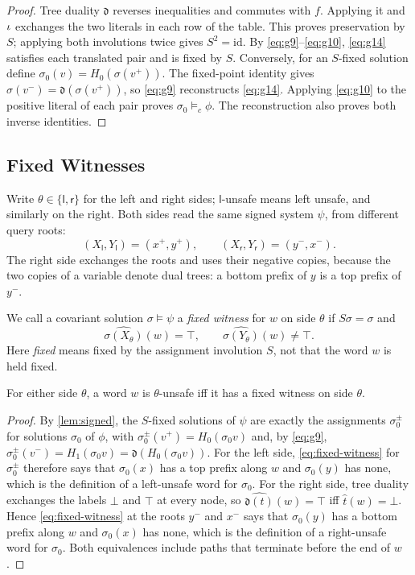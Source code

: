 \begin{proof} Tree duality $\mathfrak d$ reverses inequalities and commutes with
$f$. Applying it and $\iota$ exchanges the two literals in each row of
the table. This proves preservation by $S$; applying both involutions twice gives
$S^2=\mathrm{id}$. By \eqref{eq:g9}--\eqref{eq:g10},
\eqref{eq:g14} satisfies each translated pair and is fixed by $S$. Conversely, for
an $S$-fixed solution define $\sigma_0(v)=H_0(\sigma(v^+))$. The fixed-point
identity gives $\sigma(v^-)=\mathfrak d(\sigma(v^+))$, so \eqref{eq:g9} reconstructs \eqref{eq:g14}. Applying \eqref{eq:g10}
to the positive literal of each pair proves $\sigma_0\models_c\phi$.
The reconstruction also proves both inverse identities. \end{proof}


\subsection{Fixed Witnesses}\label{sec:fixed-witness}
Write $\theta\in\{\mathsf l,\mathsf r\}$ for the left and right sides;
$\mathsf l$-unsafe means left unsafe, and similarly on the right. Both sides
read the same signed system $\psi$, from different query roots:
\[
 (X_{\mathsf l},Y_{\mathsf l})=(x^+,y^+),\qquad
 (X_{\mathsf r},Y_{\mathsf r})=(y^-,x^-).
\]
The right side exchanges the roots and uses their negative copies, because
the two copies of a variable denote dual trees: a bottom prefix of $y$ is a
top prefix of $y^-$.

We call a covariant solution $\sigma\models\psi$ a \emph{fixed
witness} for $w$ on side $\theta$ if $S\sigma=\sigma$ and
\begin{equation}\label{eq:fixed-witness}
 \widehat{\sigma(X_\theta)}(w)=\top,\qquad
 \widehat{\sigma(Y_\theta)}(w)\ne\top.
\end{equation}
Here \emph{fixed} means fixed by the assignment involution $S$, not that
the word $w$ is held fixed.

\begin{lemma}\label{lem:fixed-witness}
For either side $\theta$, a word $w$ is $\theta$-unsafe iff it has a fixed
witness on side $\theta$.
\end{lemma}
\begin{proof}
By \cref{lem:signed}, the $S$-fixed solutions of $\psi$ are exactly the
assignments $\sigma_0^{\pm}$ for solutions $\sigma_0$ of $\phi$, with
$\sigma_0^{\pm}(v^+)=H_0(\sigma_0v)$ and, by \eqref{eq:g9},
$\sigma_0^{\pm}(v^-)=H_1(\sigma_0v)=\mathfrak d(H_0(\sigma_0v))$. For the left
side, \eqref{eq:fixed-witness} for $\sigma_0^{\pm}$ therefore says that
$\sigma_0(x)$ has a top prefix along $w$ and $\sigma_0(y)$ has none, which is
the definition of a left-unsafe word for $\sigma_0$. For the right side, tree
duality exchanges the labels $\bot$ and $\top$ at every node, so
$\widehat{\mathfrak d(t)}(w)=\top$ iff $\widehat t(w)=\bot$. Hence
\eqref{eq:fixed-witness} at the roots $y^-$ and $x^-$ says that $\sigma_0(y)$
has a bottom prefix along $w$ and $\sigma_0(x)$ has none, which is the
definition of a right-unsafe word for $\sigma_0$. Both equivalences include
paths that terminate before the end of $w$.
\end{proof}

